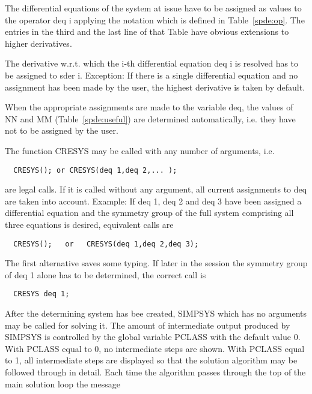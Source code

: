The differential equations of the system at issue have to be assigned
as values to the operator deq i applying the notation which is defined
in Table~\ref{spde:op}. The entries in the third and the last line of
that Table have obvious extensions to higher derivatives.

The derivative w.r.t. which the i-th differential equation deq i is
resolved has to be assigned to sder i. Exception: If there is a single
differential equation and no assignment has been made by the user, the
highest derivative is taken by default.

When the appropriate assignments are made to the variable deq, the
values of NN and MM (Table~\ref{spde:useful}) are determined
automatically, i.e. they have not to be assigned by the user.

The function CRESYS may be called with any number of arguments, i.e.

\begin{verbatim}
  CRESYS(); or CRESYS(deq 1,deq 2,... );
\end{verbatim}

 are legal calls. If it is called without any argument, all current
assignments to deq are taken into account. Example: If deq 1, deq 2
and deq 3 have been assigned a differential equation and the symmetry
group of the full system comprising all three equations is desired,
equivalent calls are

\begin{verbatim}
  CRESYS();   or   CRESYS(deq 1,deq 2,deq 3);
\end{verbatim}

The first alternative saves some typing. If later in the session the
symmetry group of deq 1 alone has to be determined, the correct call
is

\begin{verbatim}
  CRESYS deq 1;
\end{verbatim}

After the determining system has bee created, SIMPSYS which has no
arguments may be called for solving it. The amount of intermediate
output produced by SIMPSYS is controlled by the global variable PCLASS
with the default value 0.  With PCLASS equal to 0, no
intermediate steps are shown. With PCLASS equal to 1, all intermediate
steps are displayed so that the solution algorithm may be followed
 through in detail. Each time the algorithm
passes through the top of the main solution loop the message


